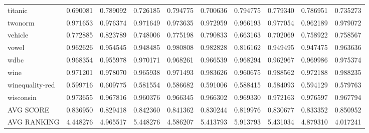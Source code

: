 \begin{tabular}{lrrrrrrrrr}
titanic         &             0.690081 &             0.789092 &            0.726185 &              0.794775 &              0.700636 &             0.794775 &      0.779340 &      0.786951 &     0.735273 \\
twonorm         &             0.971653 &             0.976374 &            0.971649 &              0.973635 &              0.972959 &             0.966193 &      0.977054 &      0.962189 &     0.979072 \\
vehicle         &             0.772885 &             0.823789 &            0.748006 &              0.775198 &              0.790833 &             0.663163 &      0.702069 &      0.758922 &     0.758567 \\
vowel           &             0.962626 &             0.954545 &            0.948485 &              0.980808 &              0.982828 &             0.816162 &      0.949495 &      0.947475 &     0.963636 \\
wdbc            &             0.968354 &             0.955978 &            0.970171 &              0.968261 &              0.966539 &             0.968294 &      0.962967 &      0.969986 &     0.975374 \\
wine            &             0.971201 &             0.978070 &            0.965938 &              0.971493 &              0.983626 &             0.960675 &      0.988562 &      0.972188 &     0.988235 \\
winequality-red &             0.599716 &             0.609775 &            0.581554 &              0.586682 &              0.591006 &             0.588415 &      0.584093 &      0.594129 &     0.579763 \\
wisconsin       &             0.973655 &             0.967816 &            0.960376 &              0.966345 &              0.966302 &             0.969330 &      0.972163 &      0.976597 &     0.967794 \\
AVG SCORE       &             0.836950 &             0.829418 &            0.842360 &              0.841362 &              0.830244 &             0.819976 &      0.830677 &      0.833352 &     0.850952 \\
AVG RANKING     &             4.448276 &             4.965517 &            5.448276 &              4.586207 &              5.413793 &             5.913793 &      5.431034 &      4.879310 &     4.017241 \\
\bottomrule
\end{tabular}

